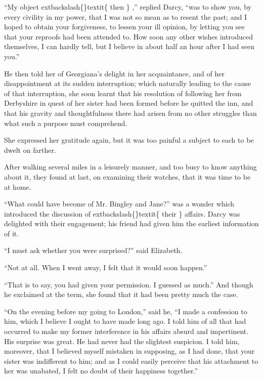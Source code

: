 \documentclass[10pt]{book}
\begin{document}
   “My object
   	extbackslash\{\}textit\{
    then
   \}
   ,” replied Darcy, “was to show you, by every civility
in my power, that I was not so mean as to resent the past; and I hoped
to obtain your forgiveness, to lessen your ill opinion, by letting you
see that your reproofs had been attended to. How soon any other wishes
introduced themselves, I can hardly
   tell, but I believe in about half
an hour after I had seen you.”
  

   He then told her of Georgiana’s delight in her acquaintance, and of her
disappointment at its sudden interruption; which naturally leading to
the cause of that interruption, she soon learnt that his resolution of
following her from Derbyshire in quest of her sister had been formed
before he quitted the inn, and that his gravity and thoughtfulness there
had arisen from no other struggles than what such a purpose must
comprehend.
  

   She expressed her gratitude again, but it was too painful a subject to
each to be dwelt on farther.
  

   After walking several miles in a leisurely manner, and too busy to know
anything about it, they found at last, on examining their watches, that
it was time to be at home.
  

   “What could have become of Mr. Bingley and Jane?” was a wonder which
introduced the discussion of
   	extbackslash\{\}textit\{
    their
   \}
   affairs. Darcy was delighted with
their engagement; his friend had given him the earliest information of
it.
  

   “I must ask whether you were surprised?” said Elizabeth.
  

   “Not at all. When I went away, I felt that it would soon happen.”
  

   “That is to say, you had given your permission. I guessed as much.” And
though he exclaimed at the term, she found that it had been pretty much
the case.
  

   “On the evening before my going to London,” said he, “I made a
confession to him, which I believe I ought to have made long ago. I told
him of all that had occurred to make my former interference in his
affairs absurd and impertinent. His surprise was great. He had never had
the slightest suspicion. I told him, moreover, that I
   believed myself
mistaken in supposing, as I had done, that your sister was indifferent
to him; and as I could easily perceive that his attachment to her was
unabated, I felt no doubt of their happiness together.”
  
\end{document}
